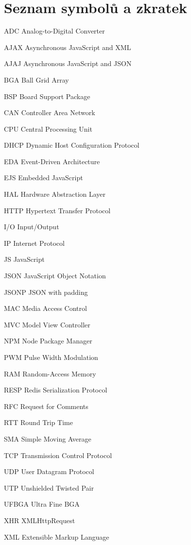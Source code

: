 \documentclass[oneside,12pt,a4paper,draft]{book} %
\makeatletter
\newcommand{\tocfill}{\cleaders\hbox{$\m@th \mkern\@dotsep mu . \mkern\@dotsep mu$}\hfill}
\newcommand{\abbrlabel}[1]{\makebox[6cm][l]{\textbf{#1}\ \tocfill}}
\newenvironment{abbreviations}{\begin{list}{}{\renewcommand{\makelabel}{\abbrlabel}%
        \setlength{\labelwidth}{6cm}\setlength{\leftmargin}{\labelwidth+\labelsep}%
                                              \setlength{\itemsep}{0pt}}}{\end{list}}
\makeatother
\begin{document}
\chapter*{Seznam symbolů a zkratek}
\noindent
\begin{abbreviations}
\item[ADC]		Analog-to-Digital Converter
\item[AJAX]		Asynchronous JavaScript and XML
\item[AJAJ]		Asynchronous JavaScript and JSON
\item[BGA]		Ball Grid Array
\item[BSP]		Board Support Package
\item[CAN]		Controller Area Network
\item[CPU]		Central Processing Unit
\item[DHCP]		Dynamic Host Configuration Protocol
\item[EDA]		Event-Driven Architecture
\item[EJS]		Embedded JavaScript
\item[HAL]		Hardware Abstraction Layer
\item[HTTP]		Hypertext Transfer Protocol
\item[I/O]		Input/Output
\item[IP]		Internet Protocol
\item[JS]		JavaScript
\item[JSON]		JavaScript Object Notation
\item[JSONP]	JSON with padding
\item[MAC]		Media Access Control
\item[MVC]		Model View Controller
\item[NPM]		Node Package Manager
\item[PWM]		Pulse Width Modulation
\item[RAM]		Random-Access Memory
\item[RESP]		Redis Serialization Protocol
\item[RFC]		Request for Comments
\item[RTT]		Round Trip Time
\item[SMA]		Simple Moving Average
\item[TCP]		Transmission Control Protocol
\item[UDP]		User Datagram Protocol
\item[UTP]		Unshielded Twisted Pair
\item[UFBGA]	Ultra Fine BGA
\item[XHR]		XMLHttpRequest
\item[XML]		Extensible Markup Language
\end{abbreviations}
\end{document}
